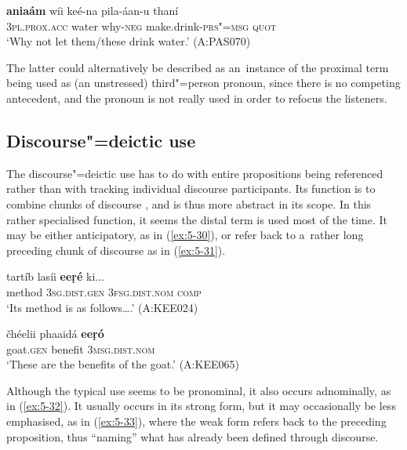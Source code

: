 \begin{exe}
\ex
\label{ex:5-29}
\gll \textbf{aniaám} wíi keé-na pila-áan-u thaní \\
\textsc{3pl.prox.acc} water why-\textsc{neg} make.drink-\textsc{prs"=msg} \textsc{quot}\\
\glt `Why not let them/these drink water.' (A:PAS070)
\end{exe}
The latter could alternatively be described as an~instance of the proximal term being used as (an unstressed) third"=person pronoun, since there is no competing antecedent, and the pronoun is not really used in order to refocus the listeners.

\subsection{Discourse"=deictic use}
\label{subsec:5-2-5}

The discourse"=deictic use has to do with entire propositions being referenced rather than with tracking individual discourse participants. Its function is to combine chunks of discourse \citep[432]{diessel2006}, and is thus more abstract in its scope. In this rather specialised function, it seems the distal term is used most of the time. It may be either anticipatory, as in (\ref{ex:5-30}), or refer back to a~rather long preceding chunk of discourse as in (\ref{ex:5-31}).

\begin{exe}
\ex
\label{ex:5-30}
\gll tartíb lasíi \textbf{eeṛé} ki...\\
method \textsc{3sg}.\textsc{dist.gen} \textsc{3fsg}.\textsc{dist.nom} \textsc{comp}\\
\glt `Its method is as follows{\ldots}.' (A:KEE024)

\ex
\label{ex:5-31}
\gll čhéelii phaaidá \textbf{eeṛó}\\
goat.\textsc{gen} benefit \textsc{3msg}.\textsc{dist.nom}\\
\glt `These are the benefits of the goat.' (A:KEE065)
\end{exe}

Although the typical use seems to be pronominal, it also occurs adnominally, as in (\ref{ex:5-32}). It usually occurs in its strong form, but it may occasionally be less emphasised, as in (\ref{ex:5-33}), where the weak form refers back to the preceding proposition, thus ``naming'' what has already been defined through discourse.

